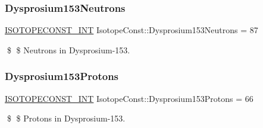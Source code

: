 \subsubsection{\texorpdfstring{Dysprosium153\+Neutrons}{Dysprosium153Neutrons}}
{\footnotesize\ttfamily \mbox{\hyperlink{group___isotope_const-_macros_ga5f18360b3e99483a35c32d789e62621c}{I\+S\+O\+T\+O\+P\+E\+C\+O\+N\+S\+T\+\_\+\+I\+NT}} Isotope\+Const\+::\+Dysprosium153\+Neutrons = 87}

\$ \$ Neutrons in Dysprosium-\/153. \mbox{\label{group___isotope_const-_dysprosium-_dy153_gaa7f3beb3a6e03d5114921774eb2b99c7}} 
\subsubsection{\texorpdfstring{Dysprosium153\+Protons}{Dysprosium153Protons}}
{\footnotesize\ttfamily \mbox{\hyperlink{group___isotope_const-_macros_ga5f18360b3e99483a35c32d789e62621c}{I\+S\+O\+T\+O\+P\+E\+C\+O\+N\+S\+T\+\_\+\+I\+NT}} Isotope\+Const\+::\+Dysprosium153\+Protons = 66}

\$ \$ Protons in Dysprosium-\/153. 